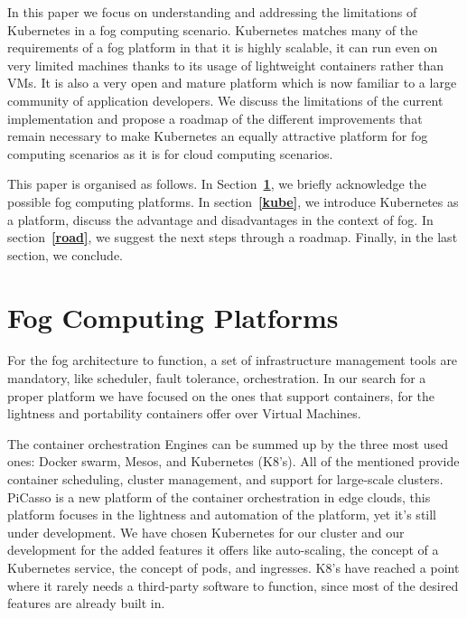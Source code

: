 \documentclass[letterpaper,twocolumn,10pt]{article}
\let\origref\ref
\def\ref#1{\textbf{\origref{#1}}}
\begin{document}
In this paper we focus on understanding and addressing the limitations
of Kubernetes in a fog computing scenario. Kubernetes matches many of
the requirements of a fog platform in that it is highly scalable, it
can run even on very limited machines thanks to its usage of
lightweight containers rather than VMs. It is also a very open and
mature platform which is now familiar to a large community of
application developers. We discuss the limitations of the current
implementation and propose a roadmap of the different improvements
that remain necessary to make Kubernetes an equally attractive
platform for fog computing scenarios as it is for cloud computing
scenarios.




This paper is organised as follows. In Section~\ref{plat}, we briefly
acknowledge the possible fog computing platforms. In
section~\ref{kube}, we introduce Kubernetes as a platform, discuss the
advantage and disadvantages in the context of fog. In
section~\ref{road}, we suggest the next steps through a
roadmap. Finally, in the last section, we conclude.


\section{Fog Computing Platforms}\label{plat}

For the fog architecture to function, a set of infrastructure
management tools are mandatory, like scheduler, fault tolerance,
orchestration. In our search for a proper platform we have focused on
the ones that support containers, for the lightness and portability
containers offer over Virtual Machines.

The container orchestration Engines can be summed up by the three most
used ones: Docker swarm, Mesos, and Kubernetes (K8's). All of the
mentioned provide container scheduling, cluster management, and
support for large-scale clusters.  PiCasso\cite{picasso} is a new
platform of the container orchestration in edge clouds, this platform
focuses in the lightness and automation of the platform, yet it's
still under development. We have chosen
Kubernetes for our cluster and our development for the added features
it offers like auto-scaling, the concept of a Kubernetes service, the
concept of pods, and ingresses. K8's have reached a point where it
rarely needs a third-party software to function, since most of the
desired features are already built in. 
\end{document}
